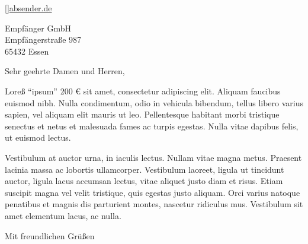 \documentclass[
	fontsize=12pt,
	parskip=full,
	paper=A4,
	fromalign=right,
	fromphone=true,
	fromemail=true,
	foldmarks=true,
	version=last,
]{scrlttr2}
\begin{document}





[]{\href{http://absender.de}{absender.de}}







\begin{letter}{
	Empfänger GmbH\\
	Empfängerstraße 987\\
	65432 Essen
}

\opening{Sehr geehrte Damen und Herren,}

Loreß "`ipsum"' 200 € sit amet, consectetur adipiscing elit. Aliquam faucibus euismod nibh. Nulla condimentum, odio in vehicula bibendum, tellus libero varius sapien, vel aliquam elit mauris ut leo. Pellentesque habitant morbi tristique senectus et netus et malesuada fames ac turpis egestas. Nulla vitae dapibus felis, ut euismod lectus.

Vestibulum at auctor urna, in iaculis lectus. Nullam vitae magna metus. Praesent lacinia massa ac lobortis ullamcorper. Vestibulum laoreet, ligula ut tincidunt auctor, ligula lacus accumsan lectus, vitae aliquet justo diam et risus. Etiam suscipit magna vel velit tristique, quis egestas justo aliquam. Orci varius natoque penatibus et magnis dis parturient montes, nascetur ridiculus mus. Vestibulum sit amet elementum lacus, ac nulla.

\closing{Mit freundlichen Grüßen}




\end{letter}
\end{document}

